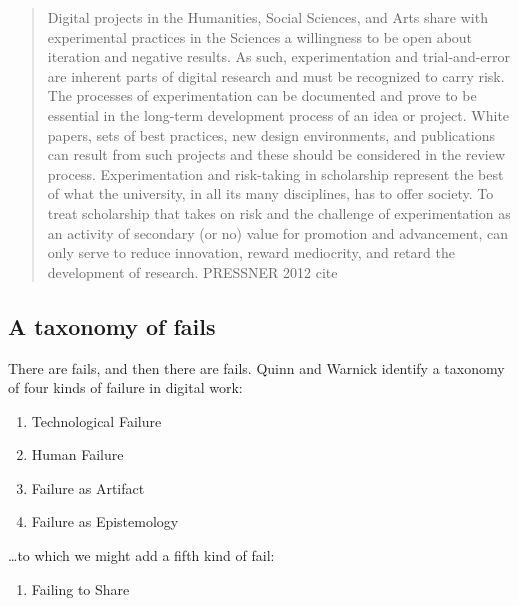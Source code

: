 \documentclass[english,]{book}
\providecommand{\tightlist}{%
  \setlength{\itemsep}{0pt}\setlength{\parskip}{0pt}}
\begin{document}
\begin{quote}
Digital projects in the Humanities, Social Sciences, and Arts share with
experimental practices in the Sciences a willingness to be open about
iteration and negative results. As such, experimentation and
trial-and-error are inherent parts of digital research and must be
recognized to carry risk. The processes of experimentation can be
documented and prove to be essential in the long-term development
process of an idea or project. White papers, sets of best practices, new
design environments, and publications can result from such projects and
these should be considered in the review process. Experimentation and
risk-taking in scholarship represent the best of what the university, in
all its many disciplines, has to offer society. To treat scholarship
that takes on risk and the challenge of experimentation as an activity
of secondary (or no) value for promotion and advancement, can only serve
to reduce innovation, reward mediocrity, and retard the development of
research. PRESSNER 2012 cite
\end{quote}

\subsection{A taxonomy of fails}\label{a-taxonomy-of-fails}

There are fails, and then there are fails. Quinn and Warnick identify a
taxonomy of four kinds of failure in digital work:

\begin{enumerate}
\def\labelenumi{\arabic{enumi}.}
\tightlist
\item
  Technological Failure
\item
  Human Failure
\item
  Failure as Artifact
\item
  Failure as Epistemology
\end{enumerate}

\ldots{}to which we might add a fifth kind of fail:

\begin{enumerate}
\def\labelenumi{\arabic{enumi}.}
\setcounter{enumi}{4}
\tightlist
\item
  Failing to Share
\end{enumerate}
\end{document}
